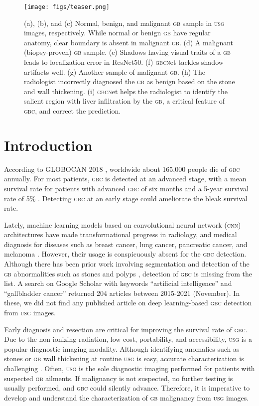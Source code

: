\documentclass[10pt,twocolumn,letterpaper]{article}
\def\cnn{\textsc{cnn}\xspace}
\def\usg{\textsc{usg}\xspace}
\def\gbc{\textsc{gbc}\xspace}
\def\gb{\textsc{gb}\xspace}
\def\gbcnet{\textsc{gbcn}et\xspace}
\begin{document}
 
\begin{figure}[t]
    \centering
    \texttt{[image: figs/teaser.png]}
    \caption{(a), (b), and (c) Normal, benign, and malignant \gb sample in \usg images, respectively. While normal or benign \gb have regular anatomy, clear boundary is absent in malignant \gb. (d) A malignant (biopsy-proven) \gb sample. (e) Shadows having visual traits of a \gb leads to localization error in ResNet50. (f) \gbcnet tackles shadow artifacts well. (g) Another sample of malignant \gb. (h) The radiologist incorrectly diagnosed the \gb as benign based on the stone and wall thickening. (i) \gbcnet helps the radiologist to identify the salient region with liver infiltration by the \gb, a critical feature of \gbc, and correct the prediction.}
    \label{fig:teaser}
\end{figure}


\section{Introduction}

According to GLOBOCAN 2018 \cite{bray2018global}, worldwide about 165,000 people die of \gbc annually. For most patients, \gbc is detected at an advanced stage, with a mean survival rate for patients with advanced \gbc of six months and a 5-year survival rate of 5\% \cite{randi2006gallbladder, gupta2021locally}. Detecting \gbc at an early stage could ameliorate the bleak survival rate. 

Lately, machine learning models based on convolutional neural network (\cnn) architectures have made transformational progress in radiology, and medical diagnosis for diseases such as breast cancer, lung cancer, pancreatic cancer, and melanoma \cite{ardila2019end, bejnordi2017diagnostic, chu2019application, codella2017deep, han2017breast}. However, their usage is conspicuously absent for the \gbc detection. Although there has been prior work involving segmentation and detection of the \gb abnormalities such as stones and polyps \cite{gbPolyp, gbPolyp2, gbAutomatic}, detection of \gbc is missing from the list. A search on Google Scholar with keywords ``artificial intelligence'' and ``gallbladder cancer'' returned 204 articles between 2015-2021 (November). In these, we did not find any published article on deep learning-based \gbc detection from \usg images.



Early diagnosis and resection are critical for improving the survival rate of \gbc. Due to the non-ionizing radiation, low cost, portability, and accessibility, \usg is a popular diagnostic imaging modality. Although identifying anomalies such as stones or \gb wall thickening at routine \usg is easy, accurate characterization is challenging \cite{gupta2020imaging, gb-rads-paper}. Often, \usg is the sole diagnostic imaging performed for patients with suspected \gb ailments. If malignancy is not suspected, no further testing is usually performed, and \gbc could silently advance. Therefore, it is imperative to develop and understand the characterization of \gb malignancy from \usg images.
\end{document}
